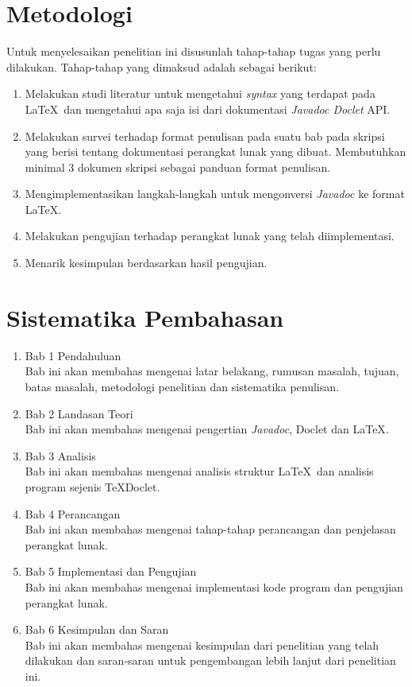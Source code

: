 \section{Metodologi}
\label{sec:metlit}
Untuk menyelesaikan penelitian ini disusunlah tahap-tahap tugas yang perlu dilakukan. Tahap-tahap yang dimaksud adalah sebagai berikut:
\begin{enumerate}
	\item Melakukan studi literatur untuk mengetahui {\it syntax} yang terdapat pada \LaTeX\ dan mengetahui apa saja isi dari dokumentasi {\it Javadoc Doclet} API.
	\item Melakukan survei terhadap format penulisan pada suatu bab pada skripsi yang berisi tentang dokumentasi perangkat lunak yang dibuat. Membutuhkan minimal 3 dokumen skripsi sebagai panduan format penulisan.
	\item Mengimplementasikan langkah-langkah untuk mengonversi {\it Javadoc} ke format \LaTeX.
	\item Melakukan pengujian terhadap perangkat lunak yang telah diimplementasi.
	\item Menarik kesimpulan berdasarkan hasil pengujian.
\end{enumerate}

\section{Sistematika Pembahasan}
\label{sec:sispem}
\begin{enumerate}
	\item Bab 1 Pendahuluan\\
	Bab ini akan membahas mengenai latar belakang, rumusan masalah, tujuan, batas masalah, metodologi penelitian dan sistematika penulisan.
	\item Bab 2 Landasan Teori\\
	Bab ini akan membahas mengenai pengertian {\it Javadoc}, Doclet dan \LaTeX.
	\item Bab 3 Analisis\\
	Bab ini akan membahas mengenai analisis struktur \LaTeX\ dan analisis program sejenis TeXDoclet.
	\item Bab 4 Perancangan\\
	Bab ini akan membahas mengenai tahap-tahap perancangan dan penjelasan perangkat lunak.
	\item Bab 5 Implementasi dan Pengujian\\
	Bab ini akan membahas mengenai implementasi kode program dan pengujian perangkat lunak.
	\item Bab 6 Kesimpulan dan Saran\\
	Bab ini akan membahas mengenai kesimpulan dari penelitian yang telah dilakukan dan saran-saran untuk pengembangan lebih lanjut dari penelitian ini.
\end{enumerate}

















